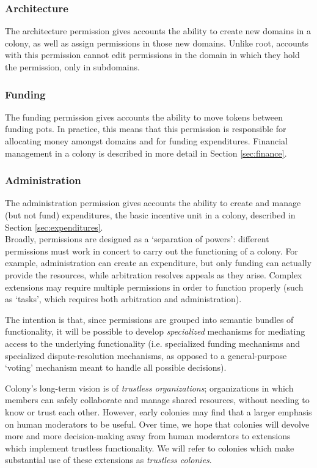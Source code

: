 \subsubsection*{Architecture}

The architecture permission gives accounts the ability to create new domains in a colony, as well as assign permissions in those new domains. Unlike root, accounts with this permission cannot edit permissions in the domain in which they hold the permission, only in subdomains.

\subsubsection*{Funding}

The funding permission gives accounts the ability to move tokens between funding pots. In practice, this means that this permission is responsible for allocating money amongst domains and for funding expenditures. Financial management in a colony is described in more detail in Section \ref{sec:finance}.

\subsubsection*{Administration}

The administration permission gives accounts the ability to create and manage (but not fund) expenditures, the basic incentive unit in a colony, described in Section \ref{sec:expenditures}. \\

Broadly, permissions are designed as a `separation of powers': different permissions must work in concert to carry out the functioning of a colony. For example, administration can create an expenditure, but only funding can actually provide the resources, while arbitration resolves appeals as they arise. Complex extensions may require multiple permissions in order to function properly (such as `tasks', which requires both arbitration and administration).

The intention is that, since permissions are grouped into semantic bundles of functionality, it will be possible to develop \textit{specialized} mechanisms for mediating access to the underlying functionality (i.e. specialized funding mechanisms and specialized dispute-resolution mechanisms, as opposed to a general-purpose `voting' mechanism meant to handle all possible decisions).

Colony's long-term vision is of \textit{trustless organizations}; organizations in which members can safely collaborate and manage shared resources, without needing to know or trust each other. However, early colonies may find that a larger emphasis on human moderators to be useful. Over time, we hope that colonies will devolve more and more decision-making away from human moderators to extensions which implement trustless functionality. We will refer to colonies which make substantial use of these extensions as \textit{trustless colonies}.

